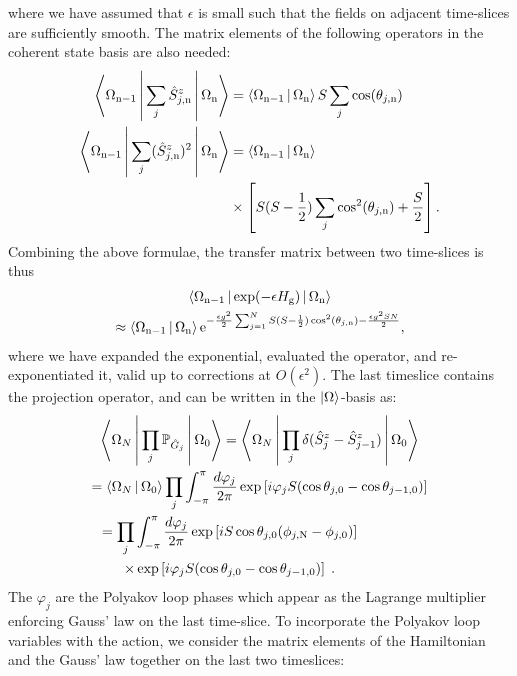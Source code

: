 \documentclass[aps,prl,reprint,twocolumn,superscriptaddress,floatfix,nofootinbib]{revtex4-1}
\begin{document}
where we have assumed that $\epsilon$ is small such that the fields on adjacent time-slices are sufficiently smooth. 
The matrix elements of the following operators in the coherent state basis are also needed:
\begin{equation}
	\begin{split}
		\Braket{\Omega_{\rm n-1} | \sum_j \hat{S}^z_{j,{\rm n}} | \Omega_{\rm n} } &= \Braket{\Omega_{\rm n-1} | \Omega_{\rm n}} S \sum_j \cos (\theta_{j,{\rm n}}) \\
		\Braket{\Omega_{\rm n-1} | \sum_j (\hat{S}_{j,{\rm n}}^z)^2 | \Omega_{\rm n} } &= \Braket{\Omega_{\rm n-1}|\Omega_{\rm n}} \\ 
		&\times \left[ S (S-\frac{1}{2}) \sum_j \cos^2 (\theta_{j,{\rm n}}) + \frac{S}{2} \right].
	\end{split}
\end{equation}
Combining the above formulae, the transfer matrix between two time-slices is thus
\begin{multline}
	\Braket{\Omega_{\rm n-1}| {\rm exp} (-\epsilon H_{\rm g}) | \Omega_{\rm n} } \\
	\approx \Braket{\Omega_{\rm n-1}| \Omega_{\rm n} }
	{\rm e}^{-\frac{\epsilon g^2}{2} \sum_{j=1}^N S (S - \frac{1}{2}) \cos^2(\theta_{j, {\rm n}}) - \frac{\epsilon g^2 S N}{2}},
	\label{eq:tmat}
\end{multline}
where we have expanded the exponential, evaluated the operator, and re-exponentiated it, valid up to corrections at $O(\epsilon^2)$. The last timeslice contains the projection operator, and can be written in the $\ket{\Omega}$-basis as:
\begin{gather}
	\Braket{\Omega_N | \prod_j \mathbb{P}_{\hat{G}_j} | \Omega_0 } 
	= \Braket{\Omega_N| \prod_j \delta (\hat{S}^z_j - \hat{S}^z_{j-1} ) | \Omega_0 } \nonumber \\
	= \Braket{\Omega_N |\Omega_0} \prod_j \int_{-\pi}^{\pi} \frac{d \varphi_{j}}{2 \pi} 
	\exp \left[ i \varphi_{j} S (\cos \theta_{j,{\rm 0}} - \cos \theta_{j-1,{\rm 0}})  \right] \nonumber \\
	\hspace{-1.5cm}
	= \prod_j \int_{-\pi}^{\pi} \frac{d \varphi_{j}}{2 \pi} 
	\exp \left[ i S \cos\theta_{j,0} (\phi_{j,{\rm N}} - \phi_{j,0}) \right] \nonumber \\
	\hspace{-1.5cm} \times \exp \left[ i \varphi_{j} S (\cos \theta_{j,{\rm 0}} - \cos \theta_{j-1,{\rm 0}}) \right] \;.
\end{gather}
The $\varphi_j$ are the Polyakov loop phases which appear as the Lagrange multiplier enforcing Gauss' law on the last time-slice. To incorporate the Polyakov loop variables with the action, we consider the matrix elements of the Hamiltonian and the Gauss' law together on the last two timeslices:
\end{document}

